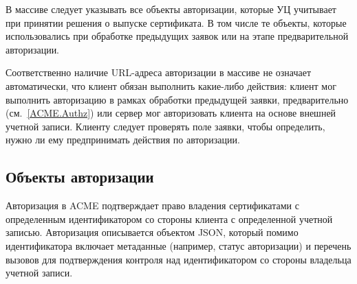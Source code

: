 В массиве  следует указывать все объекты авторизации, 
которые УЦ учитывает при принятии решения о выпуске сертификата. В том числе те
объекты, которые использовались при обработке предыдущих заявок или на этапе
предварительной авторизации.
%

Соответственно наличие URL-адреса авторизации в массиве  
не означает автоматически, что клиент обязан выполнить какие-либо действия:
клиент мог выполнить авторизацию в рамках обработки предыдущей заявки, 
предварительно (см.~\ref{ACME.Authz}) или сервер мог авторизовать клиента 
на основе внешней учетной записи.   
%
Клиенту следует проверять поле  заявки, чтобы определить, нужно ли 
ему предпринимать действия по авторизации.

\subsection{Объекты авторизации}\label{ACME.Res.Authz}
 
Авторизация в ACME подтверждает право владения сертификатами с определенным 
идентификатором со стороны клиента с определенной учетной записью.
%
%
Авторизация описывается объектом JSON, который помимо идентификатора включает
метаданные (например, статус авторизации) и перечень вызовов для подтверждения
контроля над идентификатором со стороны владельца учетной записи.

